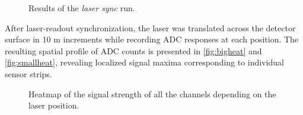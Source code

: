\begin{figure}[H]
	\centering
	\caption{Results of the \textit{laser sync} run.}
	\label{fig:lasersync}
\end{figure}

After laser-readout synchronization, the laser was translated across the detector surface in 10 \textmu m increments while recording ADC responses at each position. The resulting spatial profile of ADC counts is presented in \autoref{fig:bigheat} and \autoref{fig:smallheat}, revealing localized signal maxima corresponding to individual sensor strips.

\begin{figure}[H]
	\centering
	\caption{Heatmap of the signal strength of all the channels  depending on the laser position.}
	\label{fig:bigheat}
\end{figure}

